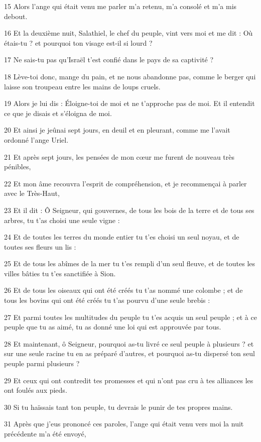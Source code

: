 \par 15 Alors l'ange qui était venu me parler m'a retenu, m'a consolé et m'a mis debout.
\par 16 Et la deuxième nuit, Salathiel, le chef du peuple, vint vers moi et me dit : Où étais-tu ? et pourquoi ton visage est-il si lourd ?
\par 17 Ne sais-tu pas qu'Israël t'est confié dans le pays de sa captivité ?
\par 18 Lève-toi donc, mange du pain, et ne nous abandonne pas, comme le berger qui laisse son troupeau entre les mains de loups cruels.
\par 19 Alors je lui dis : Éloigne-toi de moi et ne t'approche pas de moi. Et il entendit ce que je disais et s'éloigna de moi.
\par 20 Et ainsi je jeûnai sept jours, en deuil et en pleurant, comme me l'avait ordonné l'ange Uriel.
\par 21 Et après sept jours, les pensées de mon cœur me furent de nouveau très pénibles,
\par 22 Et mon âme recouvra l'esprit de compréhension, et je recommençai à parler avec le Très-Haut,
\par 23 Et il dit : Ô Seigneur, qui gouvernes, de tous les bois de la terre et de tous ses arbres, tu t'as choisi une seule vigne :
\par 24 Et de toutes les terres du monde entier tu t'es choisi un seul noyau, et de toutes ses fleurs un lis :
\par 25 Et de tous les abîmes de la mer tu t'es rempli d'un seul fleuve, et de toutes les villes bâties tu t'es sanctifiée à Sion.
\par 26 Et de tous les oiseaux qui ont été créés tu t'as nommé une colombe ; et de tous les bovins qui ont été créés tu t'as pourvu d'une seule brebis :
\par 27 Et parmi toutes les multitudes du peuple tu t'es acquis un seul peuple ; et à ce peuple que tu as aimé, tu as donné une loi qui est approuvée par tous.
\par 28 Et maintenant, ô Seigneur, pourquoi as-tu livré ce seul peuple à plusieurs ? et sur une seule racine tu en as préparé d'autres, et pourquoi as-tu dispersé ton seul peuple parmi plusieurs ?
\par 29 Et ceux qui ont contredit tes promesses et qui n'ont pas cru à tes alliances les ont foulés aux pieds.
\par 30 Si tu haïssais tant ton peuple, tu devrais le punir de tes propres mains.
\par 31 Après que j'eus prononcé ces paroles, l'ange qui était venu vers moi la nuit précédente m'a été envoyé,
